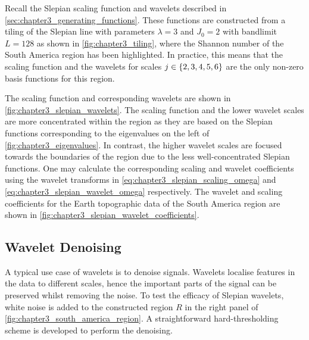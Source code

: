 Recall the Slepian scaling function and wavelets described in \cref{sec:chapter3_generating_functions}.
These functions are constructed from a tiling of the Slepian line with parameters \(\lambda=3\) and \(J_{0}=2\) with bandlimit \(L=128\) as shown in \cref{fig:chapter3_tiling}, where the Shannon number of the South America region has been highlighted.
In practice, this means that the scaling function and the wavelets for scales \(j \in \{2, 3, 4, 5, 6\}\) are the only non-zero basis functions for this region.

The scaling function and corresponding wavelets are shown in \cref{fig:chapter3_slepian_wavelets}.
The scaling function and the lower wavelet scales are more concentrated within the region as they are based on the Slepian functions corresponding to the eigenvalues on the left of \cref{fig:chapter3_eigenvalues}.
In contrast, the higher wavelet scales are focused towards the boundaries of the region due to the less well-concentrated Slepian functions.
One may calculate the corresponding scaling and wavelet coefficients using the wavelet transforms in \cref{eq:chapter3_slepian_scaling_omega} and \cref{eq:chapter3_slepian_wavelet_omega} respectively.
The wavelet and scaling coefficients for the Earth topographic data of the South America region are shown in \cref{fig:chapter3_slepian_wavelet_coefficients}.





\subsection{Wavelet Denoising}\label{sec:chapter3_wavelet_denoising}

A typical use case of wavelets is to denoise signals.
Wavelets localise features in the data to different scales, hence the important parts of the signal can be preserved whilst removing the noise.
To test the efficacy of Slepian wavelets, white noise is added to the constructed region \(R\) in the right panel of \cref{fig:chapter3_south_america_region}.
A straightforward hard-thresholding scheme is developed to perform the denoising.

